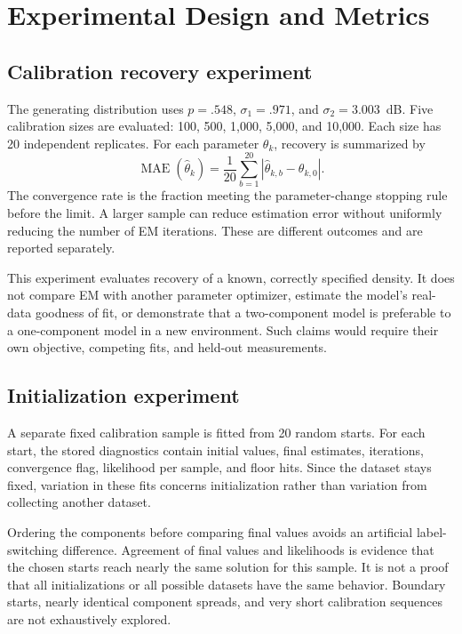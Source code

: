 \documentclass[conference,letterpaper]{IEEEtran}
\begin{document}
\section{Experimental Design and Metrics}
\subsection{Calibration recovery experiment}
The generating distribution uses $p=.548$, $\sigma_1=.971$, and $\sigma_2=3.003$~dB. Five calibration sizes are evaluated: 100, 500, 1,000, 5,000, and 10,000. Each size has 20 independent replicates. For each parameter $\theta_k$, recovery is summarized by
\begin{equation}
\operatorname{MAE}(\widehat\theta_k)=\frac{1}{20}\sum_{b=1}^{20}
|\widehat\theta_{k,b}-\theta_{k,0}|.
\end{equation}
The convergence rate is the fraction meeting the parameter-change stopping rule before the limit. A larger sample can reduce estimation error without uniformly reducing the number of EM iterations. These are different outcomes and are reported separately.

This experiment evaluates recovery of a known, correctly specified density. It does not compare EM with another parameter optimizer, estimate the model's real-data goodness of fit, or demonstrate that a two-component model is preferable to a one-component model in a new environment. Such claims would require their own objective, competing fits, and held-out measurements.

\subsection{Initialization experiment}
A separate fixed calibration sample is fitted from 20 random starts. For each start, the stored diagnostics contain initial values, final estimates, iterations, convergence flag, likelihood per sample, and floor hits. Since the dataset stays fixed, variation in these fits concerns initialization rather than variation from collecting another dataset.

Ordering the components before comparing final values avoids an artificial label-switching difference. Agreement of final values and likelihoods is evidence that the chosen starts reach nearly the same solution for this sample. It is not a proof that all initializations or all possible datasets have the same behavior. Boundary starts, nearly identical component spreads, and very short calibration sequences are not exhaustively explored.
\end{document}
